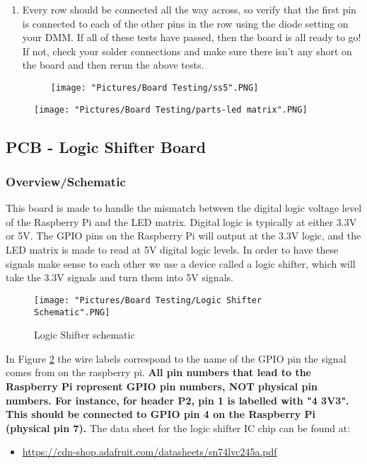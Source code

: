 \documentclass[12pt]{article}
\begin{document}
\begin{enumerate}
	\item Every row should be connected all the way across, so verify that the first pin is connected to each of the other pins in the row using the diode setting on your DMM. If all of these tests have passed, then the board is all ready to go! If not, check your solder connections and make sure there isn't any short on the board and then rerun the above tests.

	\begin{figure}[H]
	  	\centering
	    	\texttt{[image: "Pictures/Board Testing/ss5".PNG]}
		\label{ss5}
	\end{figure}

\end{enumerate}

\begin{figure}[H]
	\centering
	\texttt{[image: "Pictures/Board Testing/parts-led matrix".PNG]}
\end{figure}


\subsection{PCB - Logic Shifter Board} 
\subsubsection{Overview/Schematic}
This board is made to handle the mismatch between the digital logic voltage level of the Raspberry Pi and the LED matrix. Digital logic is typically at either 3.3V or 5V. The GPIO pins on the Raspberry Pi will output at the 3.3V logic, and the LED matrix is made to read at 5V digital logic levels. In order to have these signals make sense to each other we use a device called a logic shifter, which will take the 3.3V signals and turn them into 5V signals.

\begin{figure}[H]
  	\centering
    	\texttt{[image: "Pictures/Board Testing/Logic Shifter Schematic".PNG]}
 	\caption{Logic Shifter schematic}
	\label{ls sch}
\end{figure}

In Figure \ref{ls sch} the wire labels correspond to the name of the GPIO pin the signal comes from on the raspberry pi.  \textbf{All pin numbers that lead to the Raspberry Pi represent GPIO pin numbers, NOT physical pin numbers.  For instance, for header P2, pin 1 is labelled with "4 3V3".  This should be connected to GPIO pin 4 on the Raspberry Pi (physical pin 7).} The data sheet for the logic shifter IC chip can be found at: 
\begin{itemize}
	\item \href{https://cdn-shop.adafruit.com/datasheets/sn74lvc245a.pdf}{https://cdn-shop.adafruit.com/datasheets/sn74lvc245a.pdf}
\end{itemize}
\end{document}
